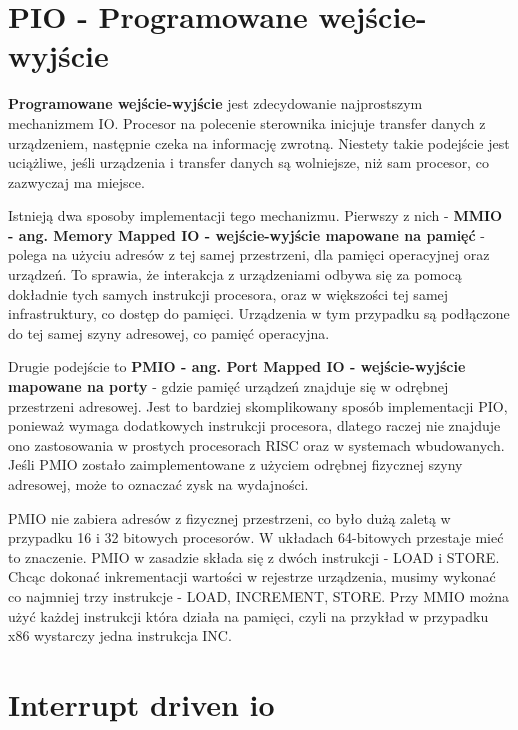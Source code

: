 \documentclass[shortabstract,inz]{iithesis}
\begin{document}
\section{PIO - Programowane wejście-wyjście} %

\textbf{Programowane wejście-wyjście} \cite{def:pio} jest zdecydowanie najprostszym mechanizmem IO. 
Procesor na polecenie sterownika inicjuje transfer danych z urządzeniem, następnie czeka na 
informację zwrotną. Niestety takie podejście jest uciążliwe, jeśli urządzenia i transfer 
danych są wolniejsze, niż sam procesor, co zazwyczaj ma miejsce. 

Istnieją dwa sposoby implementacji tego mechanizmu. Pierwszy z nich - 
\textbf{MMIO - ang. Memory Mapped IO - wejście-wyjście mapowane na pamięć} \cite{def:mmio} - polega na użyciu 
adresów z tej samej przestrzeni, dla pamięci operacyjnej oraz urządzeń. To sprawia, że 
interakcja z urządzeniami odbywa się za pomocą dokładnie tych samych instrukcji procesora, 
oraz w większości tej samej infrastruktury, co dostęp do pamięci. Urządzenia w tym przypadku są 
podłączone do tej samej szyny adresowej, co pamięć operacyjna.


Drugie podejście to \textbf{PMIO - ang. Port Mapped IO - wejście-wyjście mapowane na porty} -  
gdzie pamięć urządzeń znajduje się w odrębnej przestrzeni
adresowej. Jest to bardziej skomplikowany sposób implementacji PIO,
ponieważ wymaga dodatkowych instrukcji procesora, dlatego raczej nie
znajduje ono zastosowania w prostych procesorach RISC oraz w systemach
wbudowanych. Jeśli PMIO zostało zaimplementowane z użyciem odrębnej
fizycznej szyny adresowej, może to oznaczać zysk na wydajności.

PMIO nie zabiera adresów z fizycznej przestrzeni, co było dużą zaletą w przypadku 
16 i 32 bitowych procesorów. W układach 64-bitowych przestaje mieć to znaczenie. 
PMIO w zasadzie składa się z dwóch instrukcji - LOAD i STORE. Chcąc dokonać 
inkrementacji wartości w rejestrze urządzenia, musimy wykonać co najmniej trzy 
instrukcje - LOAD, INCREMENT, STORE. Przy MMIO można użyć każdej instrukcji 
która działa na pamięci, czyli na przykład w przypadku x86 wystarczy jedna instrukcja INC.


\section{Interrupt driven io} %
\label{def:przerwania}
\end{document}
